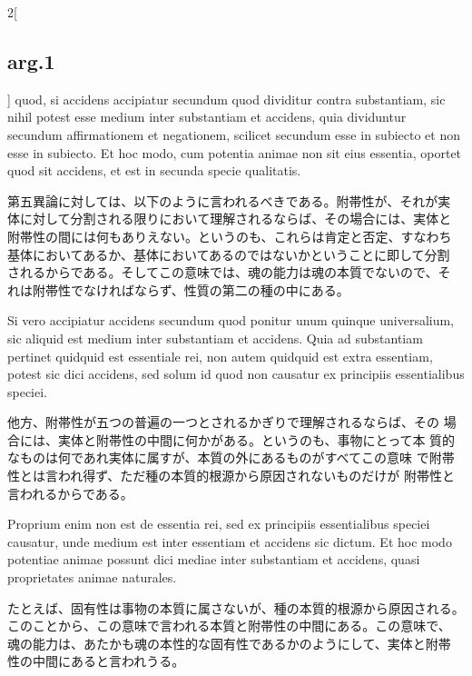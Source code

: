 \documentclass[paper=a4paper,fontsize=10pt,jafontsize=9pt,titlepage]{jlreq}
\begin{document}
\begin{paracol}{2}[\subsection{arg.1}]
  quod, si accidens accipiatur secundum
quod dividitur contra substantiam, sic nihil potest esse medium inter
substantiam et accidens, quia dividuntur secundum affirmationem et
negationem, scilicet secundum esse in subiecto et non esse in
subiecto. Et hoc modo, cum potentia animae non sit eius essentia,
oportet quod sit accidens, et est in secunda specie qualitatis.

\switchcolumn

第五異論に対しては、以下のように言われるべきである。附帯性が、それが実
体に対して分割される限りにおいて理解されるならば、その場合には、実体と
附帯性の間には何もありえない。というのも、これらは肯定と否定、すなわち
基体においてあるか、基体においてあるのではないかということに即して分割
されるからである。そしてこの意味では、魂の能力は魂の本質でないので、そ
れは附帯性でなければならず、性質の第二の種の中にある。

\switchcolumn*

 Si vero accipiatur accidens secundum quod ponitur unum quinque
universalium, sic aliquid est medium inter substantiam et
accidens. Quia ad substantiam pertinet quidquid est essentiale rei,
non autem quidquid est extra essentiam, potest sic dici accidens, sed
solum id quod non causatur ex principiis essentialibus speciei.

\switchcolumn


 他方、附帯性が五つの普遍の一つとされるかぎりで理解されるならば、その
 場合には、実体と附帯性の中間に何かがある。というのも、事物にとって本
 質的なものは何であれ実体に属すが、本質の外にあるものがすべてこの意味
 で附帯性とは言われ得ず、ただ種の本質的根源から原因されないものだけが
 附帯性と言われるからである。

\switchcolumn*

 Proprium enim non est de essentia rei, sed ex principiis
essentialibus speciei causatur, unde medium est inter essentiam et
accidens sic dictum. Et hoc modo potentiae animae possunt dici mediae
inter substantiam et accidens, quasi proprietates animae naturales.

\switchcolumn

たとえば、固有性は事物の本質に属さないが、種の本質的根源から原因される。
このことから、この意味で言われる本質と附帯性の中間にある。この意味で、
魂の能力は、あたかも魂の本性的な固有性であるかのようにして、実体と附帯
性の中間にあると言われうる。


\end{paracol}
\end{document}
